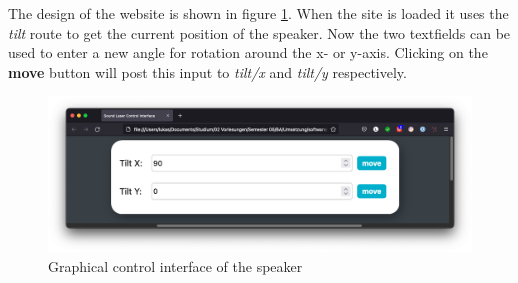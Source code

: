 %
The design of the website is shown in figure \ref{fig:software:mov:website}. When the site is loaded it uses the \textit{tilt} route to get the current position of the speaker. Now the two textfields can be used to enter a new angle for rotation around the x- or y-axis. Clicking on the \textbf{move} button will post this input to \textit{tilt/x} and \textit{tilt/y} respectively.
%
\begin{figure}[ht]
  \centering
  \includegraphics[height=\smallheight]{src/assets/pictures/software/control_interface_xl.png}
  \caption{Graphical control interface of the speaker}\label{fig:software:mov:website}
\end{figure}